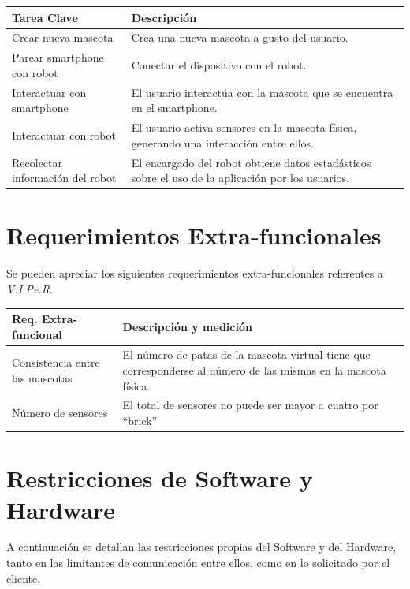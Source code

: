 \documentclass[letterpaper,12pt]{article} %
\numberwithin{equation}{section} %
\numberwithin{figure}{section} %
\numberwithin{table}{section} %
\begin{document}
\begin{table}[H]
  \centering
  \begin{tabular}{p{5cm}p{9cm}}\hline
    Tarea Clave & Descripci\'on \\ \hline\hline %
    Crear nueva mascota & Crea una nueva mascota a gusto del usuario. \\ \hline
    Parear smartphone con robot & Conectar el dispositivo con el robot. \\ \hline
    Interactuar con smartphone & El usuario interact\'ua con la mascota que se encuentra en el smartphone. \\ \hline
    Interactuar con robot & El usuario activa sensores en la mascota f\'isica, generando una interacci\'on entre ellos. \\ \hline
    Recolectar informaci\'on del robot & El encargado del robot obtiene datos estad\'asticos sobre el uso de la aplicaci\'on por los usuarios. \\ \hline\hline
  \end{tabular}
\end{table}

\newpage
\section{Requerimientos Extra-funcionales}

Se pueden apreciar los siguientes requerimientos extra-funcionales referentes a \emph{V.I.Pe.R.}

\begin{table}[H]
  \centering
  \begin{tabular}{p{5cm}p{9cm}}\hline 
    Req. Extra-funcional & Descripci\'on y medici\'on \\ \hline\hline %
    Consistencia entre las mascotas & El n\'umero de patas de la mascota virtual tiene que corresponderse al n\'umero de las mismas en la mascota f\'isica.\\ \hline
    N\'umero de sensores & El total de sensores no puede ser mayor a cuatro por ``brick''\\\hline \hline
  \end{tabular}
\end{table}

\newpage
\section{Restricciones de Software y Hardware}

A continuaci\'on se detallan las restricciones propias del Software y del Hardware, tanto en las limitantes de comunicaci\'on entre ellos, como en lo solicitado por el cliente.\\
\end{document}
